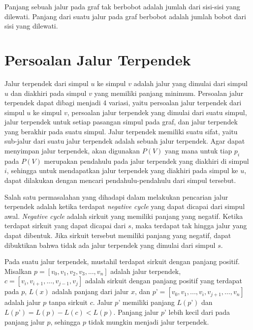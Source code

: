 Panjang sebuah jalur pada graf tak berbobot adalah jumlah dari sisi-sisi yang dilewati. Panjang dari suatu jalur pada graf berbobot adalah jumlah bobot dari sisi yang dilewati.

\section{Persoalan Jalur Terpendek}

Jalur terpendek dari simpul $u$ ke simpul $v$ adalah jalur yang dimulai dari simpul $u$ dan diakhiri pada simpul $v$ yang memiliki panjang minimum. 
Persoalan jalur terpendek dapat dibagi menjadi 4 variasi, yaitu persoalan jalur terpendek dari simpul $u$ ke simpul $v$, persoalan jalur terpendek yang 
dimulai dari suatu simpul, jalur terpendek untuk setiap pasangan simpul pada graf, dan jalur terpendek yang berakhir pada suatu simpul. Jalur 
terpendek memiliki suatu sifat, yaitu sub-jalur dari suatu jalur terpendek adalah sebuah jalur terpendek. Agar dapat menyimpan jalur terpendek, 
akan digunakan $P(V)$ yang mana untuk tiap $p_{i}$ pada $P(V)$ merupakan pendahulu pada jalur terpendek yang diakhiri di simpul $i$, sehingga untuk mendapatkan 
jalur terpendek yang diakhiri pada simpul ke $u$, dapat dilakukan dengan mencari pendahulu-pendahulu dari simpul tersebut.

\medskip


Salah satu permasalahan yang dihadapi dalam melakukan pencarian jalur terpendek adalah ketika terdapat \textit{negative cycle} yang dapat dicapai dari 
simpul awal. \textit{Negative cycle} adalah sirkuit yang memiliki panjang yang negatif. Ketika terdapat sirkuit yang dapat dicapai dari $s$, maka terdapat 
tak hingga jalur yang dapat dibentuk. Jika sirkuit tersebut memiliki panjang yang negatif, dapat dibuktikan bahwa tidak ada jalur terpendek 
yang dimulai dari simpul $s$.

Pada suatu jalur terpendek, mustahil terdapat sirkuit dengan  panjang positif. Misalkan $p = [v_{0}, v_{1}, v_{2}, v_{3}, ..., v_{n}]$ adalah jalur terpendek, 
$c = [v_{i}, v_{i+1}, ..., v_{j-1}, v_{j}]$ adalah sirkuit dengan panjang positif yang terdapat pada $p$, $L(x)$ adalah panjang dari jalur $x$, dan 
$p’ = [v_{0}, v_{1}, ..., v_{i}, v_{j+1}, …, v_{n}]$ adalah jalur $p$ tanpa sirkuit $c$. Jalur $p’$ memiliki panjang $L(p’)$ dan 
$L(p’) = L(p) - L(c) < L(p)$. Panjang jalur $p’$ lebih kecil dari pada panjang jalur $p$, sehingga $p$ tidak mungkin menjadi jalur terpendek.

